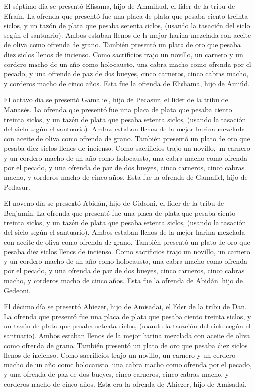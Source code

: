  El séptimo día se presentó Elisama, hijo de Ammihud, el
líder de la tribu de Efraín.  La ofrenda que presentó fue
una placa de plata que pesaba ciento treinta siclos, y un tazón de plata
que pesaba setenta siclos, (usando la tasación del siclo según el
santuario). Ambos estaban llenos de la mejor harina mezclada con aceite
de oliva como ofrenda de grano.  También presentó un plato
de oro que pesaba diez siclos llenos de incienso. Como sacrificios trajo
 un novillo, un carnero y un cordero macho de un año como
holocausto,  una cabra macho como ofrenda por el pecado,
 y una ofrenda de paz de dos bueyes, cinco carneros, cinco
cabras macho, y corderos macho de cinco años. Esta fue la ofrenda de
Elishama, hijo de Amiúd.

 El octavo día se presentó Gamaliel, hijo de Pedasur, el
líder de la tribu de Manasés.  La ofrenda que presentó fue
una placa de plata que pesaba ciento treinta siclos, y un tazón de plata
que pesaba setenta siclos, (usando la tasación del siclo según el
santuario). Ambos estaban llenos de la mejor harina mezclada con aceite
de oliva como ofrenda de grano.  También presentó un plato
de oro que pesaba diez siclos llenos de incienso. Como sacrificios trajo
 un novillo, un carnero y un cordero macho de un año como
holocausto,  una cabra macho como ofrenda por el pecado,
 y una ofrenda de paz de dos bueyes, cinco carneros, cinco
cabras macho, y corderos macho de cinco años. Esta fue la ofrenda de
Gamaliel, hijo de Pedasur.

 El noveno día se presentó Abidán, hijo de Gideoni, el
líder de la tribu de Benjamín.  La ofrenda que presentó fue
una placa de plata que pesaba ciento treinta siclos, y un tazón de plata
que pesaba setenta siclos, (usando la tasación del siclo según el
santuario). Ambos estaban llenos de la mejor harina mezclada con aceite
de oliva como ofrenda de grano.  También presentó un plato
de oro que pesaba diez siclos llenos de incienso. Como sacrificios trajo
 un novillo, un carnero y un cordero macho de un año como
holocausto,  una cabra macho como ofrenda por el pecado,
 y una ofrenda de paz de dos bueyes, cinco carneros, cinco
cabras macho, y corderos macho de cinco años. Esta fue la ofrenda de
Abidán, hijo de Gedeoni.

 El décimo día se presentó Ahiezer, hijo de Amisadai, el
líder de la tribu de Dan.  La ofrenda que presentó fue una
placa de plata que pesaba ciento treinta siclos, y un tazón de plata que
pesaba setenta siclos, (usando la tasación del siclo según el
santuario). Ambos estaban llenos de la mejor harina mezclada con aceite
de oliva como ofrenda de grano.  También presentó un plato
de oro que pesaba diez siclos llenos de incienso. Como sacrificios trajo
 un novillo, un carnero y un cordero macho de un año como
holocausto,  una cabra macho como ofrenda por el pecado,
 y una ofrenda de paz de dos bueyes, cinco carneros, cinco
cabras macho, y corderos macho de cinco años. Esta era la ofrenda de
Ahiezer, hijo de Amisadai.

